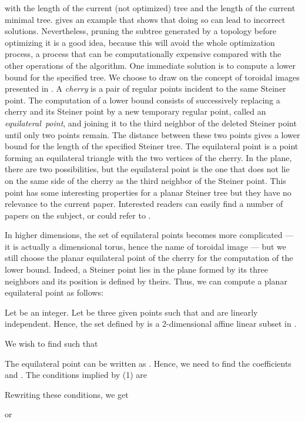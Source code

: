 \documentclass{article}
\theoremstyle{plain}
\begin{document}
with  the length of the current (not optimized) tree and  the length of the current minimal tree. 
 gives an example that shows that doing so can lead to incorrect solutions. 
Nevertheless, pruning the subtree generated by a topology before optimizing it is a good idea, because this will avoid the whole optimization process, a process that can be computationally expensive compared with the other operations of the algorithm. 
One immediate solution is to compute a lower bound for the specified tree. We choose to draw on the concept of toroidal images presented in \cite{ref2}. 
A \emph{cherry} is a pair of regular points incident to the same Steiner point. 
The computation of a lower bound consists of successively replacing a cherry and its Steiner point by a new temporary regular point, called an \mbox{\emph{equilateral point}}, and joining it to the third neighbor of the deleted Steiner point until only two points remain. The distance between these two points gives a lower bound for the length of the specified Steiner tree. 
The equilateral point is a point forming an equilateral triangle with the two vertices of the cherry. 
In the plane, there are two possibilities, but the equilateral point is the one that does not lie on the same side of the cherry as the third neighbor of the Steiner point. 
This point has some interesting properties for a planar Steiner tree but they have no relevance to the current paper. 
Interested readers can easily find a number of papers on the subject, or could refer to \cite{ref4}. 

In higher dimensions, the set of equilateral points becomes more complicated --- it is actually a  dimensional torus, hence the name of toroidal image --- but we still choose the planar equilateral point of the cherry for the computation of the lower bound. 
Indeed, a Steiner point lies in the plane formed by its three neighbors and its position is defined by theirs. 
Thus, we can compute a planar equilateral point as follows: 

Let  be an integer. 
Let  be three given points such that  and  are linearly independent. 
Hence, the set  defined by  is a 2-dimensional affine linear subset in .


We wish to find  such that 

The equilateral point can be written as . 
Hence, we need to find the coefficients  and . The conditions implied by (1) are

Rewriting these conditions, we get 

or
\end{document}
